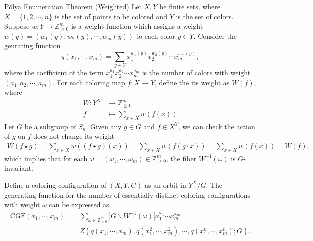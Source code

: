 \begin{theorem}{Pólya Enumeration Theorem (Weighted)}{}
    Let $X, Y$ be finite sets, where $X=\{1,2,\cdots,n\}$ is the set of points to be colored and $Y$ is the set of colors.  Suppose $w:Y\to\mathbb{Z}_{\ge 0}^m$ is a weight function which assigns a weight $w(y)=(w_1(y),w_2(y),\cdots,w_m(y))$ to each color $y\in Y$. Consider the genrating function
    \[
        q(x_1,\cdots,x_m)=\sum_{y\in Y}x_1^{w_1(y)}x_2^{w_2(y)}\cdots x_m^{w_m(y)},
    \]
    where the coefficient of the term $x_1^{a_1}x_2^{a_2}\cdots x_m^{a_m}$ is the number of colors with weight $(a_1,a_2,\cdots,a_m)$. For each coloring map $f:X\to Y$, define the its weight as $W(f)$, where
    \begin{align*}
        W:Y^X & \longrightarrow\mathbb{Z}_{\ge 0}^m \\
        f     & \longmapsto\sum_{x\in X}w(f(x))
    \end{align*}
    Let $G$ be a subgroup of $S_n$. Given any $g\in G$ and $f\in X^Y$, we can check the action of $g$ on $f$ does not change its weight
    \begin{align*}
        W(f\star g)=\sum_{x\in X}w(( f\star g)(x))=\sum_{x\in X}w(f(g\cdot x))=\sum_{x\in X}w(f(x))=W(f),
    \end{align*}
    which implies that for each $\omega=(\omega_1,\cdots,\omega_m)\in\mathbb{Z}_{\ge 0}^m$, the fiber $W^{-1}(\omega)$ is $G$-invariant.

    Define a coloring configuration of $(X,Y,G)$ as an orbit in $Y^X/G$. The generating function for the number of essentially distinct coloring configurations with weight $\omega$ can be expressed as
    \begin{align*}
        \mathrm{CGF}\left(x_1, \cdots,x_m\right) & =\sum_{\omega \in \mathbb{Z}_{\ge 0}^m}\left|G\backslash W^{-1}(\omega)\right| x_1^{\omega_1} \cdots x_m^{\omega_m}            \\
                                                 & = Z\left(q\left(x_1, \cdots,x_m\right), q\left(x_1^2, \cdots,x_m^2\right), \cdots, q\left(x_1^n, \cdots,x_m^n\right);G\right).
    \end{align*}
\end{theorem}

